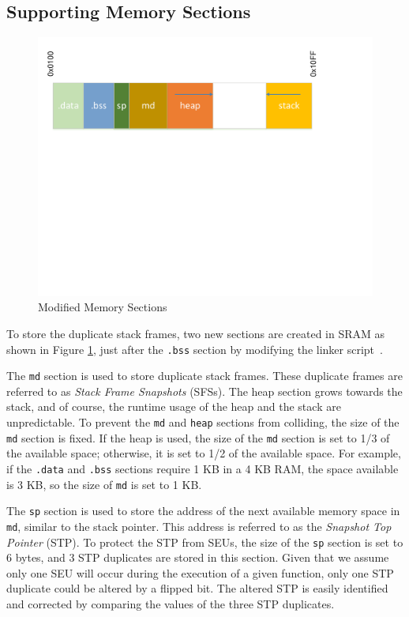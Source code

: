 \subsection{Supporting Memory Sections}\label{sec:memory_sections}
\vspace{-5pt}
\begin{figure}
\centering
\includegraphics[scale=0.35]{figures/modified_memory_model.pdf}
\caption{Modified Memory Sections}
\vspace{-15pt}
\label{fig:modified_ram_map}
\end{figure}

To store the duplicate stack frames, two new sections are created in SRAM as shown in Figure \ref{fig:modified_ram_map}, just after the \texttt{.bss} section by modifying the linker script~\cite{linkerscript}. 

The \texttt{md} section is used to store duplicate stack frames. These duplicate frames are referred to as \textit{Stack Frame Snapshots} (SFSs). The heap section grows towards the stack, and of course, the runtime usage of the heap and the stack are unpredictable. To prevent the \texttt{md} and \texttt{heap} sections from colliding, the size of the \texttt{md} section is fixed. If the heap is used, the size of the \texttt{md} section is set to 1/3 of the available space; otherwise, it is set to 1/2 of the available space. For example, if the \texttt{.data} and \texttt{.bss} sections require 1 KB in a 4 KB RAM, the space available is 3 KB, so the size of \texttt{md} is set to 1 KB.

The \texttt{sp} section is used to store the address of the next available memory space in \texttt{md}, similar to the stack pointer. This address is referred to as the \textit{Snapshot Top Pointer} (STP). To protect the STP from SEUs, the size of the \texttt{sp} section is set to 6 bytes, and 3 STP duplicates are stored in this section. Given that we assume only one SEU will occur during the execution of a given function, only one STP duplicate could be altered by a flipped bit. The altered STP is easily identified and corrected by comparing the values of the three STP duplicates.

